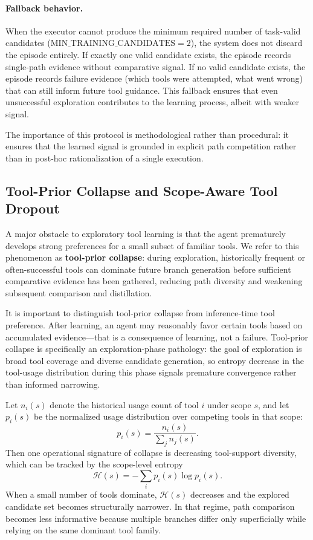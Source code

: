 \paragraph{Fallback behavior.} When the executor cannot produce the minimum required number of task-valid candidates ($\mathrm{MIN\_TRAINING\_CANDIDATES}=2$), the system does not discard the episode entirely. If exactly one valid candidate exists, the episode records single-path evidence without comparative signal. If no valid candidate exists, the episode records failure evidence (\eg which tools were attempted, what went wrong) that can still inform future tool guidance. This fallback ensures that even unsuccessful exploration contributes to the learning process, albeit with weaker signal.

The importance of this protocol is methodological rather than procedural: it ensures that the learned signal is grounded in explicit path competition rather than in post-hoc rationalization of a single execution.

\subsection{Tool-Prior Collapse and Scope-Aware Tool Dropout}
\label{sec:dropout}

A major obstacle to exploratory tool learning is that the agent prematurely develops strong preferences for a small subset of familiar tools. We refer to this phenomenon as \textbf{tool-prior collapse}: during exploration, historically frequent or often-successful tools can dominate future branch generation before sufficient comparative evidence has been gathered, reducing path diversity and weakening subsequent comparison and distillation.

It is important to distinguish tool-prior collapse from inference-time tool preference. After learning, an agent may reasonably favor certain tools based on accumulated evidence---that is a consequence of learning, not a failure. Tool-prior collapse is specifically an exploration-phase pathology: the goal of exploration is broad tool coverage and diverse candidate generation, so entropy decrease in the tool-usage distribution during this phase signals premature convergence rather than informed narrowing.

Let $n_i(s)$ denote the historical usage count of tool $i$ under scope $s$, and let $p_i(s)$ be the normalized usage distribution over competing tools in that scope:
\begin{equation}
p_i(s)=\frac{n_i(s)}{\sum_j n_j(s)}.
\end{equation}
Then one operational signature of collapse is decreasing tool-support diversity, which can be tracked by the scope-level entropy
\begin{equation}
\mathcal{H}(s) = - \sum_i p_i(s)\log p_i(s).
\end{equation}
When a small number of tools dominate, $\mathcal{H}(s)$ decreases and the explored candidate set becomes structurally narrower. In that regime, path comparison becomes less informative because multiple branches differ only superficially while relying on the same dominant tool family.

